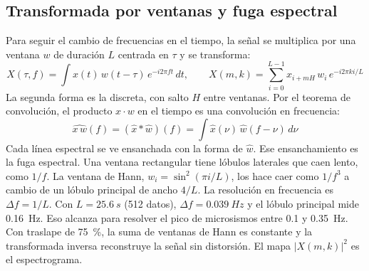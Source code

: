 \documentclass[11pt,letterpaper]{article}
\begin{document}
\subsection{Transformada por ventanas y fuga espectral}
Para seguir el cambio de frecuencias en el tiempo, la señal se multiplica por una ventana $w$ de duración $L$ centrada en $\tau$ y se transforma:
\begin{equation}
X(\tau, f) = \int x(t)\,w(t - \tau)\,e^{-i2\pi ft}\,dt, \qquad X(m,k) = \sum_{i=0}^{L-1} x_{i+mH}\,w_i\,e^{-i2\pi ki/L}
\label{eq:stft}
\end{equation}
La segunda forma es la discreta, con salto $H$ entre ventanas. Por el teorema de convolución, el producto $x\cdot w$ en el tiempo es una convolución en frecuencia:
\begin{equation}
\widehat{x\,w}(f) = (\hat x * \hat w)(f) = \int \hat x(\nu)\,\hat w(f - \nu)\,d\nu
\label{eq:convolucion}
\end{equation}
Cada línea espectral se ve ensanchada con la forma de $\hat w$. Ese ensanchamiento es la fuga espectral. Una ventana rectangular tiene lóbulos laterales que caen lento, como $1/f$. La ventana de Hann, $w_i = \sin^2(\pi i/L)$, los hace caer como $1/f^3$ a cambio de un lóbulo principal de ancho $4/L$. La resolución en frecuencia es $\Delta f = 1/L$. Con $L = \SI{25.6}{s}$ (512 datos), $\Delta f = \SI{0.039}{Hz}$ y el lóbulo principal mide \SI{0.16}{Hz}. Eso alcanza para resolver el pico de microsismos entre 0.1 y \SI{0.35}{Hz}. Con traslape de \SI{75}{\percent}, la suma de ventanas de Hann es constante y la transformada inversa reconstruye la señal sin distorsión. El mapa $|X(m,k)|^2$ es el espectrograma.
\end{document}

